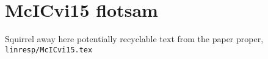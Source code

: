
\section{McICvi15 flotsam}
\label{s:flotsam}

Squirrel away here potentially recyclable text from the
paper proper, \texttt{linresp/McICvi15.tex}
